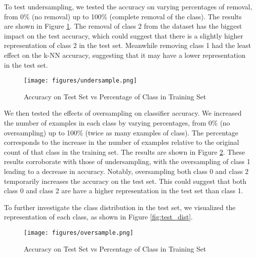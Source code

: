 \documentclass{article}
\theoremstyle{plain}
\theoremstyle{definition}
\theoremstyle{remark}
\begin{document}
        To test undersampling, we tested the accuracy on varying percentages of removal, from 0\% (no removal) up to 100\% (complete removal of the class). The results are shown in Figure \ref{fig:undersample}. The removal of class 2 from the dataset has the biggest impact on the test accuracy, which could suggest that there is a slightly higher representation of class 2 in the test set. Meanwhile removing class 1 had the least effect on the k-NN accuracy, suggesting that it may have a lower representation in the test set.

        \begin{figure}[h]
            \centering
            \begin{minipage}[t]{0.8\linewidth}
                \centering
                \texttt{[image: figures/undersample.png]}
                \caption{Accuracy on Test Set vs Percentage of Class in Training Set}
                \label{fig:undersample}
            \end{minipage}%
        \end{figure}

        We then tested the effects of oversampling on classifier accuracy. We increased the number of examples in each class by varying percentages, from 0\% (no oversampling) up to 100\% (twice as many examples of class). The percentage corresponds to the increase in the number of examples relative to the original count of that class in the training set. The results are shown in Figure \ref{fig:oversample}. These results corroborate with those of undersampling, with the oversampling of class 1 leading to a decrease in accuracy. Notably, oversampling both class 0 and class 2 temporarily increases the accuracy on the test set. This could suggest that both class 0 and class 2 are have a higher representation in the test set than class 1.

        To further investigate the class distribution in the test set, we visualized the representation of each class, as shown in Figure \ref{fig:test_dist}.

        \begin{figure}[h]
            \centering
            \begin{minipage}[t]{0.8\linewidth}
                \centering
                \texttt{[image: figures/oversample.png]}
                \caption{Accuracy on Test Set vs Percentage of Class in Training Set}
                \label{fig:oversample}
            \end{minipage}%
        \end{figure}
\end{document}
